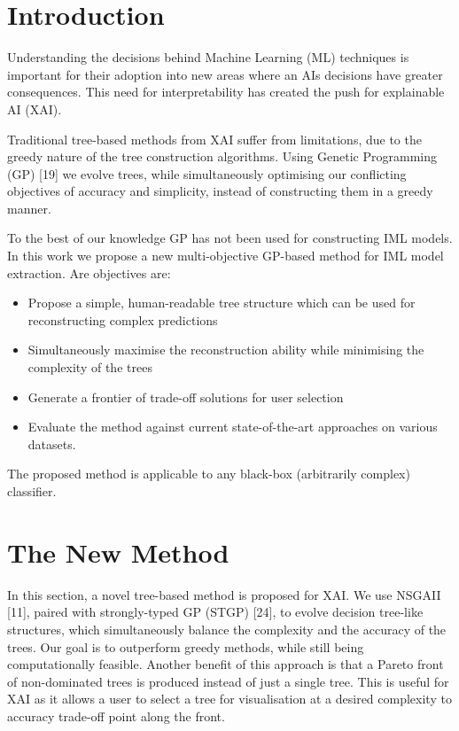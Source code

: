 \section{Introduction} 
Understanding the decisions behind Machine Learning (ML) techniques is important for their adoption into new areas where an AI\textquotesingle s decisions have greater consequences. This need for interpretability has created the push for explainable AI (XAI).

Traditional tree-based methods from XAI suffer from limitations, due to the greedy nature of the tree construction algorithms. Using Genetic Programming (GP) [19] we evolve trees, while simultaneously optimising our conflicting objectives of accuracy and simplicity, instead of constructing them in a greedy manner.

To the best of our knowledge GP has not been used for constructing IML models. In this work we propose a new multi-objective GP-based method for IML model extraction. Are objectives are:  
\begin{itemize}
  \item Propose a simple, human-readable tree structure which can be used for reconstructing complex predictions
  \item Simultaneously maximise the reconstruction ability while minimising the complexity of the trees
  \item Generate a frontier of trade-off solutions for user selection
  \item Evaluate the method against current state-of-the-art approaches on various datasets. 
\end{itemize}
The proposed method is applicable to any black-box (arbitrarily complex) classifier.

\section{The New Method}
In this section, a novel tree-based method is proposed for XAI. We use NSGAII [11], paired with strongly-typed GP (STGP) [24], to evolve decision tree-like structures, which simultaneously balance the complexity and the accuracy of the trees. Our goal is to outperform greedy methods, while still being computationally feasible. Another benefit of this approach is that a Pareto front of non-dominated trees is produced instead of just a single tree. This is useful for XAI as it allows a user to select a tree for visualisation at a desired complexity to accuracy trade-off point along the front.
